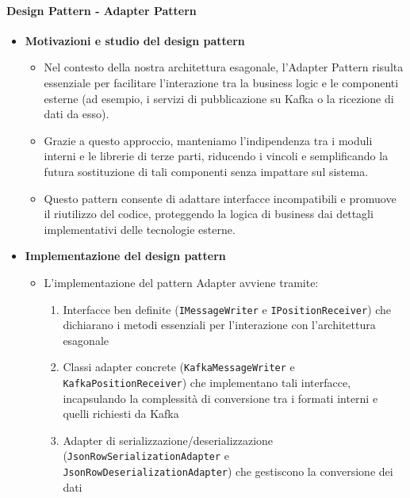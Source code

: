\documentclass[10pt]{article}
\begin{document}
        
    \paragraph{Design Pattern - Adapter Pattern}
    \begin{itemize} 
    \item \textbf{Motivazioni e studio del design pattern}
    \begin{itemize}
        \item Nel contesto della nostra architettura esagonale, l'Adapter Pattern risulta essenziale per facilitare l'interazione tra la business logic e le componenti esterne (ad esempio, i servizi di pubblicazione su Kafka o la ricezione di dati da esso).
        \item Grazie a questo approccio, manteniamo l'indipendenza tra i moduli interni e le librerie di terze parti, riducendo i vincoli e semplificando la futura sostituzione di tali componenti senza impattare sul sistema.
        \item Questo pattern consente di adattare interfacce incompatibili e promuove il riutilizzo del codice, proteggendo la logica di business dai dettagli implementativi delle tecnologie esterne.
    \end{itemize}
    
    \item \textbf{Implementazione del design pattern}
    \begin{itemize}
        \item L'implementazione del pattern Adapter avviene tramite:
        \begin{enumerate}
            \item Interfacce ben definite (\texttt{IMessageWriter} e \texttt{IPositionReceiver}) che dichiarano i metodi essenziali per l'interazione con l'architettura esagonale
            \item Classi adapter concrete (\texttt{KafkaMessageWriter} e \texttt{KafkaPositionReceiver}) che implementano tali interfacce, incapsulando la complessità di conversione tra i formati interni e quelli richiesti da Kafka
            \item Adapter di serializzazione/deserializzazione (\texttt{JsonRowSerializationAdapter} e \\ \texttt{JsonRowDeserializationAdapter}) che gestiscono la conversione dei dati
        \end{enumerate}
    \end{itemize}
    

\end{itemize}
\end{document}
